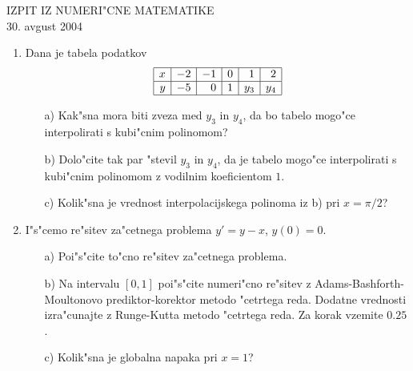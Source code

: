 \documentclass[12pt,a4paper]{article}
\begin{document}
\begin{center}
  IZPIT IZ NUMERI"CNE MATEMATIKE\\
  30. avgust 2004
\end{center}
\vspace{1cm}

\begin{enumerate}
  \item Dana je tabela podatkov
    $$\begin{array}{|r|r|r|r|r|r|}
           \hline
	    	x & -2 & -1 & 0 & 1 & 2 \\ \hline
		y & -5 &  0 & 1 & y_3 & y_4\\ \hline
	\end{array}
	$$
	\begin{itemize}
		\item[a)] Kak"sna mora biti zveza med $y_3$ in $y_4$,
		da bo tabelo mogo"ce interpolirati s kubi"cnim polinomom?
		\item [b)]Dolo"cite tak par "stevil $y_3$ in $y_4$,
		da je tabelo mogo"ce interpolirati s kubi"cnim
		polinomom z vodilnim koeficientom $1$.
		\item[c)] Kolik"sna je vrednost interpolacijskega polinoma
		iz b) pri $x=\pi/2$?
								
  \end{itemize}
  \item I"s"cemo re"sitev za"cetnega problema $y'=y-x$, $y(0)=0$.
    \begin{itemize}
    	\item[a)] Poi"s"cite to"cno re"sitev za"cetnega problema.
	\item[b)] Na intervalu $[0,1]$ poi"s"cite numeri"cno re"sitev 
	z Adams-Bashforth-Moultonovo prediktor-korektor metodo "cetrtega 
	reda. Dodatne vrednosti izra"cunajte z Runge-Kutta metodo "cetrtega 
	reda. Za korak vzemite $0.25$.
	\item[c)] Kolik"sna je globalna napaka pri $x=1$?
    \end{itemize}
\end{enumerate}
\end{document}
